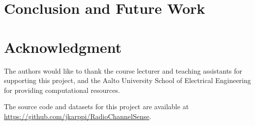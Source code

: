 \documentclass[journal,comsoc]{IEEEtran}
\begin{document}








\section{Conclusion and Future Work}


\appendix


\section*{Acknowledgment}
The authors would like to thank the course lecturer and teaching assistants
for supporting this project, and the Aalto University School of Electrical
Engineering for providing computational resources.

The source code and datasets for this project are available at
\url{https://github.com/jkarppi/RadioChannelSense}.


\nocite{*}

\end{document}
